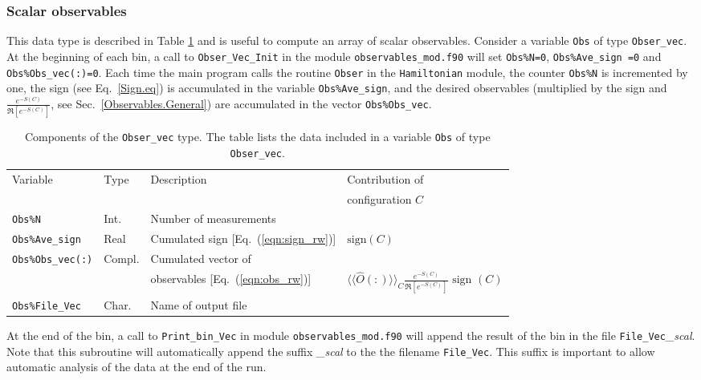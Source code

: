 \documentclass{SciPost}
\begin{document}
\subsubsection{Scalar observables}
%
This data type  is described in Table  \ref{table:Obser_vec} and  is useful to compute an array of  scalar observables.   Consider  a variable \texttt{Obs} of type  \texttt{Obser\_vec}.  At the beginning of each bin,  a call to  \texttt{Obser\_Vec\_Init} in the module \texttt{observables\_mod.f90}  will  set   \texttt{Obs\%N=0},   \texttt{Obs\%Ave\_sign =0}  and  \texttt{Obs\%Obs\_vec(:)=0}.  Each time the main  program calls the routine \texttt{Obser}  in the  \texttt{Hamiltonian} module,  the counter \texttt{Obs\%N}   is incremented by one, the sign  (see Eq.~\ref{Sign.eq}) is accumulated in the  variable \texttt{Obs\%Ave\_sign},  and the desired observables (multiplied by the sign and   $\frac{e^{-S(C)}} {\Re \left[e^{-S(C)} \right]}$, see Sec.~\ref{Observables.General})  are accumulated in the vector \texttt{Obs\%Obs\_vec}.  
%
\begin{table}[h]
   \begin{tabular}{@{} l l l l @{}}\toprule
    Variable  &  Type      &  Description &  Contribution of  \\
        &  & & configuration $C$ \\\midrule
    \texttt{Obs\%N}                       &  Int.        &   Number of measurements &\\
    \texttt{Obs\%Ave\_sign}               &  Real     &    Cumulated sign [Eq.~(\ref{eqn:sign_rw})] & $\text{sign}(C)$  \\
    \texttt{Obs\%Obs\_vec(:)}        & Compl.      &    Cumulated vector of & \\
         &       &    observables [Eq.~(\ref{eqn:obs_rw})] &
           $ \langle \langle \hat{O}(:) \rangle \rangle_{C}\frac{e^{-S(C)}} {\Re \left[e^{-S(C)} \right]} \text{ sign }(C) $ \\
     \texttt{Obs\%File\_Vec}           &  Char.    &    Name of output file  &\\\bottomrule
   \end{tabular}
   \caption{Components of the \texttt{Obser\_vec}  type.  The table lists the data included in a variable  \texttt{Obs}  of type \texttt{Obser\_vec}.  
         \label{table:Obser_vec}}
\end{table}
%
At the end of the bin, a call to  \texttt{Print\_bin\_Vec}   in  module \texttt{observables\_mod.f90}  will  append the result of the bin in the file  \texttt{File\_Vec}\emph{\_scal}.  Note that this subroutine will automatically append the suffix \emph{\_scal}
to the the filename \texttt{File\_Vec}.
This suffix  is important to allow automatic analysis of the data at the end of the run. 
%
\end{document}
